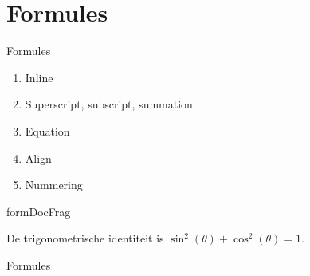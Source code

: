 \documentclass[../presentatie.tex]{subfiles}
\begin{document}
\section{Formules}

\clearrecentlist
    
\begin{frame}{Formules}
	\begin{enumerate}
		\item Inline
		\item Superscript, subscript, summation
		\item Equation
		\item Align
		\item Nummering
	\end{enumerate}
\end{frame}



\begin{saveblock}{formDocFrag}
	\begin{highlightblock}[gobble=8,linewidth=25em,framexleftmargin=0.25em]
		De trigonometrische identiteit
		is $ \sin^2(\theta) + \cos^2(\theta) = 1 $.
	\end{highlightblock}
\end{saveblock}

\begin{frame}{Formules}
	\centering
	
	\vspace{10pt}
	\begin{center}%
	\end{center}
	
\end{frame}

\def\extraslistsep{\hspace{0.5em}\textcolor{red!80!black}{\vrule width 1pt height 0.6\baselineskip\relax}\hspace{0.5em}}
\def\es#1{\adjustbox{scale=0.8}{#1}}
\end{document}

